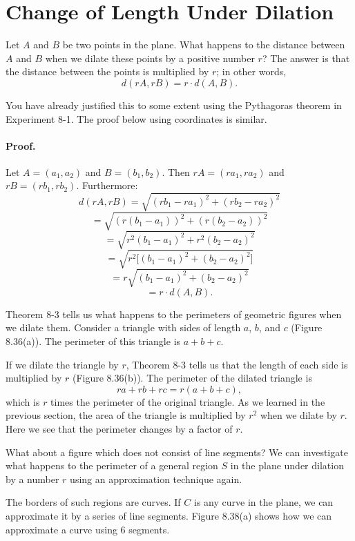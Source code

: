 \documentclass[12pt]{book} %
\begin{document}
\section{Change of Length Under Dilation}

Let $A$ and $B$ be two points in the plane. What happens to the distance between $A$ and $B$ when we dilate these points by a positive number $r$? The answer is that the distance between the points is multiplied by $r$; in other words,
\[
d(rA,rB)=r\cdot d(A,B).
\]

You have already justified this to some extent using the Pythagoras theorem in Experiment 8-1. The proof below using coordinates is similar.


\paragraph{Proof.}
Let $A=(a_1,a_2)$ and $B=(b_1,b_2)$. Then $rA=(ra_1,ra_2)$ and $rB=(rb_1,rb_2)$. Furthermore:
\[
d(rA,rB)=\sqrt{(rb_1-ra_1)^2+(rb_2-ra_2)^2}
\]
\[
=\sqrt{(r(b_1-a_1))^2+(r(b_2-a_2))^2}
\]
\[
=\sqrt{r^2(b_1-a_1)^2+r^2(b_2-a_2)^2}
\]
\[
=\sqrt{r^2\big[(b_1-a_1)^2+(b_2-a_2)^2\big]}
\]
\[
=r\sqrt{(b_1-a_1)^2+(b_2-a_2)^2}
\]
\[
=r\cdot d(A,B).
\]

Theorem 8-3 tells us what happens to the perimeters of geometric figures when we dilate them. Consider a triangle with sides of length $a$, $b$, and $c$ (Figure 8.36(a)). The perimeter of this triangle is $a+b+c$.


If we dilate the triangle by $r$, Theorem 8-3 tells us that the length of each side is multiplied by $r$ (Figure 8.36(b)). The perimeter of the dilated triangle is
\[
ra+rb+rc=r(a+b+c),
\]
which is $r$ times the perimeter of the original triangle. As we learned in the previous section, the area of the triangle is multiplied by $r^2$ when we dilate by $r$. Here we see that the perimeter changes by a factor of $r$.

What about a figure which does not consist of line segments? We can investigate what happens to the perimeter of a general region $S$ in the plane under dilation by a number $r$ using an approximation technique again.


The borders of such regions are curves. If $C$ is any curve in the plane, we can approximate it by a series of line segments. Figure 8.38(a) shows how we can approximate a curve using 6 segments.
\end{document}
